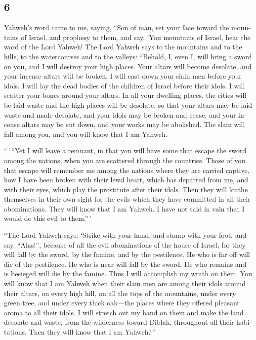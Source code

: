 \begin{paracol}{2}
\begin{otherlanguage}{english}
{\section{6}\label{section-11}}

 Yahweh's word came to me, saying,  ``Son of
man, set your face toward the mountains of Israel, and prophesy to them,
 and say, `You mountains of Israel, hear the word of the
Lord Yahweh! The Lord Yahweh says to the mountains and to the hills, to
the watercourses and to the valleys: ``Behold, I, even I, will bring a
sword on you, and I will destroy your high places.  Your
altars will become desolate, and your incense altars will be broken. I
will cast down your slain men before your idols.  I will
lay the dead bodies of the children of Israel before their idols. I will
scatter your bones around your altars.  In all your
dwelling places, the cities will be laid waste and the high places will
be desolate, so that your altars may be laid waste and made desolate,
and your idols may be broken and cease, and your incense altars may be
cut down, and your works may be abolished.  The slain will
fall among you, and you will know that I am Yahweh.

 ``\,`\,``Yet I will leave a remnant, in that you will
have some that escape the sword among the nations, when you are
scattered through the countries.  Those of you that escape
will remember me among the nations where they are carried captive, how I
have been broken with their lewd heart, which has departed from me, and
with their eyes, which play the prostitute after their idols. Then they
will loathe themselves in their own sight for the evils which they have
committed in all their abominations.  They will know that
I am Yahweh. I have not said in vain that I would do this evil to
them.''\,'

 ``The Lord Yahweh says: `Strike with your hand, and
stamp with your foot, and say, ``Alas!'', because of all the evil
abominations of the house of Israel; for they will fall by the sword, by
the famine, and by the pestilence.  He who is far off
will die of the pestilence. He who is near will fall by the sword. He
who remains and is besieged will die by the famine. Thus I will
accomplish my wrath on them.  You will know that I am
Yahweh when their slain men are among their idols around their altars,
on every high hill, on all the tops of the mountains, under every green
tree, and under every thick oak---the places where they offered pleasant
aroma to all their idols.  I will stretch out my hand on
them and make the land desolate and waste, from the wilderness toward
Diblah, throughout all their habitations. Then they will know that I am
Yahweh.'\,''


\end{otherlanguage}
\end{paracol}
